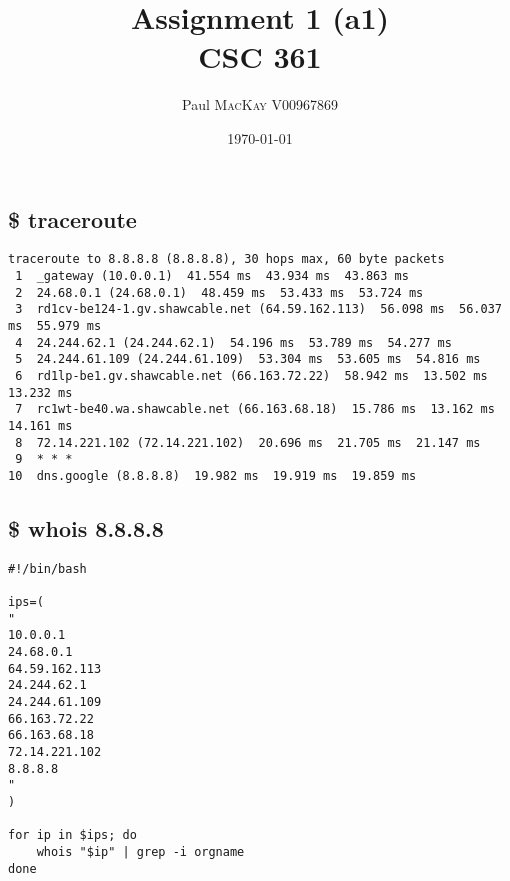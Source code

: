 \documentclass[
	letterpaper, %
	10pt, %
]{CSUniSchoolLabReport}
\title{Assignment 1 (a1)\\ CSC 361} %
\author{Paul \textsc{MacKay} V00967869} %
\date{\today} %
\begin{document}
\maketitle %




\section{}


\subsection{\$ traceroute}
\begin{center}
\begin{verbatim}
traceroute to 8.8.8.8 (8.8.8.8), 30 hops max, 60 byte packets
 1  _gateway (10.0.0.1)  41.554 ms  43.934 ms  43.863 ms
 2  24.68.0.1 (24.68.0.1)  48.459 ms  53.433 ms  53.724 ms
 3  rd1cv-be124-1.gv.shawcable.net (64.59.162.113)  56.098 ms  56.037 ms  55.979 ms
 4  24.244.62.1 (24.244.62.1)  54.196 ms  53.789 ms  54.277 ms
 5  24.244.61.109 (24.244.61.109)  53.304 ms  53.605 ms  54.816 ms
 6  rd1lp-be1.gv.shawcable.net (66.163.72.22)  58.942 ms  13.502 ms  13.232 ms
 7  rc1wt-be40.wa.shawcable.net (66.163.68.18)  15.786 ms  13.162 ms  14.161 ms
 8  72.14.221.102 (72.14.221.102)  20.696 ms  21.705 ms  21.147 ms
 9  * * *
10  dns.google (8.8.8.8)  19.982 ms  19.919 ms  19.859 ms

\end{verbatim}
\end{center}

\newpage
\subsection{\$ whois 8.8.8.8}
\begin{verbatim}
#!/bin/bash

ips=(
"
10.0.0.1
24.68.0.1
64.59.162.113
24.244.62.1
24.244.61.109
66.163.72.22
66.163.68.18
72.14.221.102
8.8.8.8
"
)

for ip in $ips; do
    whois "$ip" | grep -i orgname
done
\end{verbatim}
\end{document}
